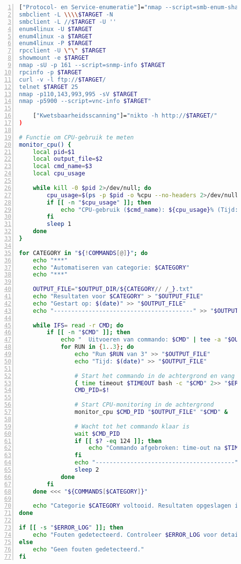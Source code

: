 \begin{lstlisting}[language=bash, basicstyle=\footnotesize\ttfamily, numbers=left, numberstyle=\tiny, breaklines=true, caption={Bash-script voor geautomatiseerde reconnaissance}, label={lst:recon-script}]
    ["Protocol- en Service-enumeratie"]="nmap --script=smb-enum-shares.nse -p445 $TARGET
smbclient -L \\\\$TARGET -N
smbclient -L //$TARGET -U ''
enum4linux -U $TARGET
enum4linux -a $TARGET
enum4linux -P $TARGET
rpcclient -U \"\" $TARGET
showmount -e $TARGET
nmap -sU -p 161 --script=snmp-info $TARGET
rpcinfo -p $TARGET
curl -v -l ftp://$TARGET/
telnet $TARGET 25
nmap -p110,143,993,995 -sV $TARGET
nmap -p5900 --script=vnc-info $TARGET"

    ["Kwetsbaarheidsscanning"]="nikto -h http://$TARGET/"
)

# Functie om CPU-gebruik te meten
monitor_cpu() {
    local pid=$1
    local output_file=$2
    local cmd_name=$3
    local cpu_usage

    while kill -0 $pid 2>/dev/null; do
        cpu_usage=$(ps -p $pid -o %cpu --no-headers 2>/dev/null)
        if [[ -n "$cpu_usage" ]]; then
            echo "CPU-gebruik ($cmd_name): ${cpu_usage}% (Tijd: $(date))" >> "$output_file"
        fi
        sleep 1
    done
}

for CATEGORY in "${!COMMANDS[@]}"; do
    echo "***"
    echo "Automatiseren van categorie: $CATEGORY"
    echo "***"

    OUTPUT_FILE="$OUTPUT_DIR/${CATEGORY// /_}.txt"
    echo "Resultaten voor $CATEGORY" > "$OUTPUT_FILE"
    echo "Gestart op: $(date)" >> "$OUTPUT_FILE"
    echo "----------------------------------------" >> "$OUTPUT_FILE"

    while IFS= read -r CMD; do
        if [[ -n "$CMD" ]]; then
            echo "  Uitvoeren van commando: $CMD" | tee -a "$OUTPUT_FILE"
            for RUN in {1..3}; do
                echo "Run $RUN van 3" >> "$OUTPUT_FILE"
                echo "Tijd: $(date)" >> "$OUTPUT_FILE"
                
                # Start het commando in de achtergrond en vang de PID op
                { time timeout $TIMEOUT bash -c "$CMD" 2>> "$ERROR_LOG" ; } >> "$OUTPUT_FILE" 2>&1 &
                CMD_PID=$!

                # Start CPU-monitoring in de achtergrond
                monitor_cpu $CMD_PID "$OUTPUT_FILE" "$CMD" &

                # Wacht tot het commando klaar is
                wait $CMD_PID
                if [[ $? -eq 124 ]]; then
                    echo "Commando afgebroken: time-out na $TIMEOUT seconden" | tee -a "$OUTPUT_FILE" "$ERROR_LOG"
                fi
                echo "----------------------------------------" >> "$OUTPUT_FILE"
                sleep 2
            done
        fi
    done <<< "${COMMANDS[$CATEGORY]}"

    echo "Categorie $CATEGORY voltooid. Resultaten opgeslagen in $OUTPUT_FILE"
done

if [[ -s "$ERROR_LOG" ]]; then
    echo "Fouten gedetecteerd. Controleer $ERROR_LOG voor details."
else
    echo "Geen fouten gedetecteerd."
fi
\end{lstlisting}